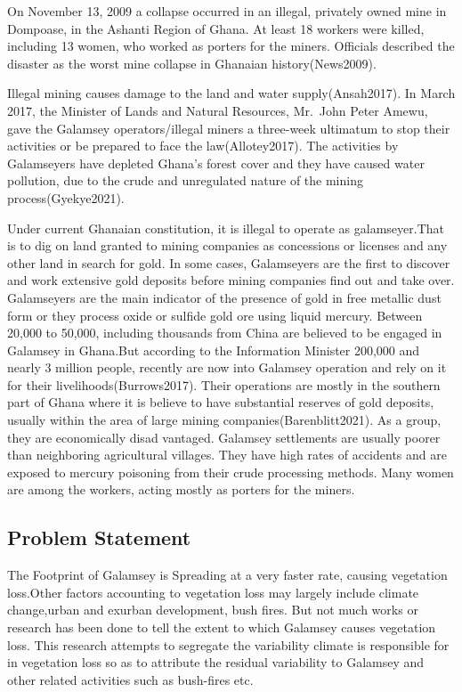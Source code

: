 \documentclass[
]{report}
\begin{document}
On November 13, 2009 a collapse occurred in an illegal, privately owned
mine in Dompoase, in the Ashanti Region of Ghana. At least 18 workers
were killed, including 13 women, who worked as porters for the miners.
Officials described the disaster as the worst mine collapse in Ghanaian
history(News2009).

Illegal mining causes damage to the land and water supply(Ansah2017). In
March 2017, the Minister of Lands and Natural Resources, Mr.~John Peter
Amewu, gave the Galamsey operators/illegal miners a three-week ultimatum
to stop their activities or be prepared to face the law(Allotey2017).
The activities by Galamseyers have depleted Ghana's forest cover and
they have caused water pollution, due to the crude and unregulated
nature of the mining process(Gyekye2021).

Under current Ghanaian constitution, it is illegal to operate as
galamseyer.That is to dig on land granted to mining companies as
concessions or licenses and any other land in search for gold. In some
cases, Galamseyers are the first to discover and work extensive gold
deposits before mining companies find out and take over. Galamseyers are
the main indicator of the presence of gold in free metallic dust form or
they process oxide or sulfide gold ore using liquid mercury. Between
20,000 to 50,000, including thousands from China are believed to be
engaged in Galamsey in Ghana.But according to the Information Minister
200,000 and nearly 3 million people, recently are now into Galamsey
operation and rely on it for their livelihoods(Burrows2017). Their
operations are mostly in the southern part of Ghana where it is believe
to have substantial reserves of gold deposits, usually within the area
of large mining companies(Barenblitt2021). As a group, they are
economically disad vantaged. Galamsey settlements are usually poorer
than neighboring agricultural villages. They have high rates of
accidents and are exposed to mercury poisoning from their crude
processing methods. Many women are among the workers, acting mostly as
porters for the miners.

\hypertarget{problem-statement}{%
\subsection{Problem Statement}\label{problem-statement}}

The Footprint of Galamsey is Spreading at a very faster rate, causing
vegetation loss.Other factors accounting to vegetation loss may largely
include climate change,urban and exurban development, bush fires. But
not much works or research has been done to tell the extent to which
Galamsey causes vegetation loss. This research attempts to segregate the
variability climate is responsible for in vegetation loss so as to
attribute the residual variability to Galamsey and other related
activities such as bush-fires etc.
\end{document}
